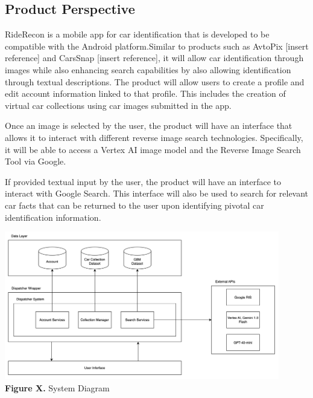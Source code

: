 \documentclass[]{article}
\begin{document}
\subsection{Product Perspective}
\label{sub:product_perspective}

RideRecon is a mobile app for car identification that is developed to be compatible with the Android platform.Similar to products such as AvtoPix [insert reference] and CarsSnap [insert reference], it will allow car identification through images while also enhancing search capabilities by also allowing identification through textual descriptions. The product will allow users to create a profile and edit account information linked to that profile. This includes the creation of virtual car collections using car images submitted in the app.

Once an image is selected by the user, the product will have an interface that allows it to interact with different reverse image search technologies. Specifically, it will be able to access a Vertex AI image model and the Reverse Image Search Tool via Google.

If provided textual input by the user, the product will have an interface to interact with Google Search. This interface will also be used to search for relevant car facts that can be returned to the user upon identifying pivotal car identification information.

\begin{center}
	\includegraphics[width=0.9\textwidth]{images/system_diagram.png} \\
	\textbf{Figure X. } System Diagram
\end{center}
\end{document}
